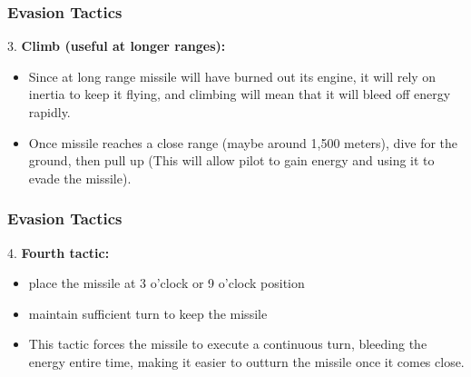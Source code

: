 \documentclass{beamer}
\begin{document}
\begin{frame}
\frametitle{Evasion Tactics}
	3.  \textbf{Climb (useful at longer ranges):}
	\begin{itemize}
		\item Since at long range missile will have burned out its engine, it will rely on inertia to keep it flying, and climbing will mean that it will bleed off energy rapidly.
		\item Once missile reaches a close range (maybe around 1,500 meters), dive for the ground, then pull up (This will allow pilot to gain energy and using it to evade the missile).
	\end{itemize}
\end{frame}
\begin{frame}
\frametitle{Evasion Tactics}

	4. \textbf{Fourth tactic:}
	\begin{itemize}
		\item place the missile at 3 o’clock or 9 o’clock position
		\item maintain sufficient turn to keep the missile 
		\item This tactic forces the missile to execute a continuous turn, bleeding the energy entire time, making it easier to outturn the missile once it comes close.
	\end{itemize}
\end{frame}
\end{document}
